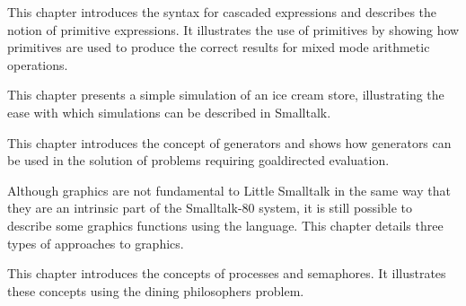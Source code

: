 This chapter introduces the syntax for cascaded expressions and describes the notion of primitive expressions. It illustrates the use of
primitives by showing how primitives are used to produce the correct
results for mixed mode arithmetic operations.


\secup

\secdown

This chapter presents a simple simulation of an ice cream store, illustrating the ease with which simulations can be described in Smalltalk.


\secup

\secdown

This chapter introduces the concept of generators and shows how
generators can be used in the solution of problems requiring goaldirected evaluation.


\secup

\secdown

Although graphics are not fundamental to Little Smalltalk in the same
way that they are an intrinsic part of the Smalltalk-80 system, it is still
possible to describe some graphics functions using the language. This
chapter details three types of approaches to graphics.


\secup

\secdown

This chapter introduces the concepts of processes and semaphores. It
illustrates these concepts using the dining philosophers problem.


\secup

\secup
